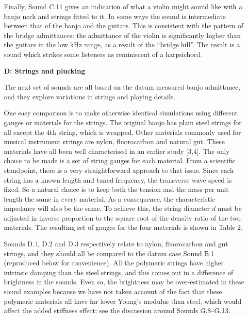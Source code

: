 \audio{}

\audio{}

  Finally, Sound C.11 gives an indication of what a violin might sound like 
  with a banjo neck and strings fitted to it. In some ways the sound is 
  intermediate between that of the banjo and the guitars. This is consistent 
  with the pattern of the bridge admittances: the admittance of the violin is 
  significantly higher than the guitars in the low kHz range, as a result of 
  the ``bridge hill''. The result is a sound which strikes some listeners as 
  reminiscent of a harpsichord. 

\audio{}

  \textbf{D: Strings and plucking} 

  The next set of sounds are all based on the datum measured banjo admittance, 
  and they explore variations in strings and playing details. 

  One easy comparison is to make otherwise identical simulations using 
  different gauges or materials for the strings. The original banjo has plain 
  steel strings for all except the 4th string, which is wrapped. Other 
  materials commonly used for musical instrument strings are nylon, 
  fluorocarbon and natural gut. These materials have all been well 
  characterised in an earlier study [3,4]. The only choice to be made is a set 
  of string gauges for each material. From a scientific standpoint, there is a 
  very straightforward approach to that issue. Since each string has a known 
  length and tuned frequency, the transverse wave speed is fixed. So a natural 
  choice is to keep both the tension and the mass per unit length the same in 
  every material. As a consequence, the characteristic impedance will also be 
  the same. To achieve this, the string diameter $d$ must be adjusted in 
  inverse proportion to the square root of the density ratio of the two 
  materials. The resulting set of gauges for the four materials is shown in 
  Table 2. 

  Sounds D.1, D.2 and D.3 respectively relate to nylon, fluorocarbon and gut 
  strings, and they should all be compared to the datum case Sound B.1 
  (reproduced below for convenience). All the polymeric strings have higher 
  intrinsic damping than the steel strings, and this comes out in a difference 
  of brightness in the sounds. Even so, the brightness may be over-estimated in 
  these sound examples because we have not taken account of the fact that these 
  polymeric materials all have far lower Young's modulus than steel, which 
  would affect the added stiffness effect: see the discussion around Sounds 
  G.8--G.13. 

